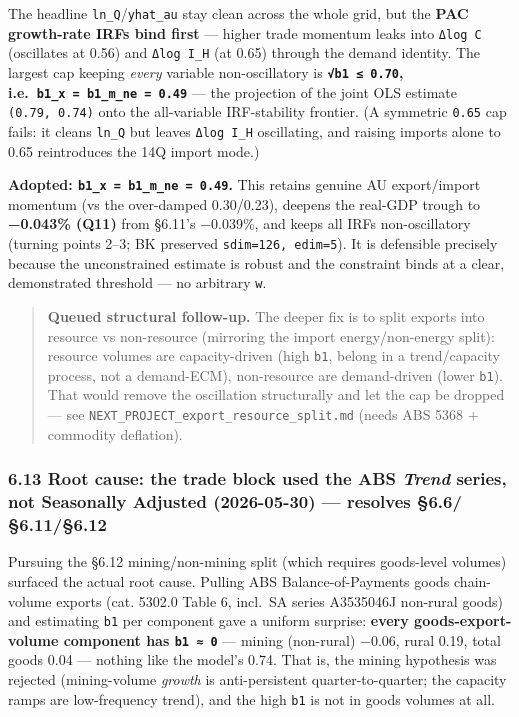 \documentclass[
]{article}
\begin{document}
The headline \texttt{ln\_Q}/\texttt{yhat\_au} stay clean across the
whole grid, but the \textbf{PAC growth-rate IRFs bind first} --- higher
trade momentum leaks into \texttt{Δlog\ C} (oscillates at 0.56) and
\texttt{Δlog\ I\_H} (at 0.65) through the demand identity. The largest
cap keeping \emph{every} variable non-oscillatory is
\textbf{\texttt{√b1\ ≤\ 0.70},
i.e.~\texttt{b1\_x\ =\ b1\_m\_ne\ =\ 0.49}} --- the projection of the
joint OLS estimate \texttt{(0.79,\ 0.74)} onto the all-variable
IRF-stability frontier. (A symmetric \texttt{0.65} cap fails: it cleans
\texttt{ln\_Q} but leaves \texttt{Δlog\ I\_H} oscillating, and raising
imports alone to 0.65 reintroduces the 14Q import mode.)

\textbf{Adopted: \texttt{b1\_x\ =\ b1\_m\_ne\ =\ 0.49}.} This retains
genuine AU export/import momentum (vs the over-damped 0.30/0.23),
deepens the real-GDP trough to \textbf{−0.043\% (Q11)} from §6.11's
−0.039\%, and keeps all IRFs non-oscillatory (turning points 2--3; BK
preserved \texttt{sdim=126,\ edim=5}). It is defensible precisely
because the unconstrained estimate is robust and the constraint binds at
a clear, demonstrated threshold --- no arbitrary \texttt{w}.

\begin{quote}
\textbf{Queued structural follow-up.} The deeper fix is to split exports
into resource vs non-resource (mirroring the import energy/non-energy
split): resource volumes are capacity-driven (high \texttt{b1}, belong
in a trend/capacity process, not a demand-ECM), non-resource are
demand-driven (lower \texttt{b1}). That would remove the oscillation
structurally and let the cap be dropped --- see
\texttt{NEXT\_PROJECT\_export\_resource\_split.md} (needs ABS 5368 +
commodity deflation).
\end{quote}

\subsubsection{\texorpdfstring{6.13 Root cause: the trade block used the
ABS \emph{Trend} series, not Seasonally Adjusted (2026-05-30) ---
\textbf{resolves
§6.6/§6.11/§6.12}}{6.13 Root cause: the trade block used the ABS Trend series, not Seasonally Adjusted (2026-05-30) --- resolves §6.6/§6.11/§6.12}}\label{root-cause-the-trade-block-used-the-abs-trend-series-not-seasonally-adjusted-2026-05-30-resolves-6.66.116.12}

Pursuing the §6.12 mining/non-mining split (which requires goods-level
volumes) surfaced the actual root cause. Pulling ABS Balance-of-Payments
goods chain-volume exports (cat. 5302.0 Table 6, incl.~SA series
A3535046J non-rural goods) and estimating \texttt{b1} per component gave
a uniform surprise: \textbf{every goods-export-volume component has
\texttt{b1\ ≈\ 0}} --- mining (non-rural) −0.06, rural 0.19, total goods
0.04 --- nothing like the model's 0.74. That is, the mining hypothesis
was rejected (mining-volume \emph{growth} is anti-persistent
quarter-to-quarter; the capacity ramps are low-frequency trend), and the
high \texttt{b1} is not in goods volumes at all.
\end{document}
